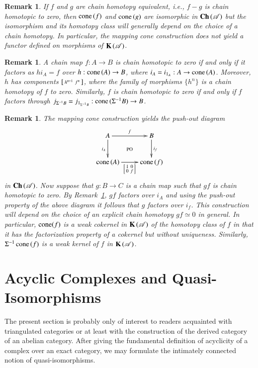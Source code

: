 \documentclass[1p]{elsarticle}
\theoremstyle{mythm}
\theoremstyle{mydef}
\newtheorem{Rem}[Thm]{Remark}
\begin{document}
\begin{Rem}
  If $f$ and $g$ are chain homotopy equivalent, i.e., $f-g$ is chain
  homotopic to zero, then $\operatorname{cone}{(f)}$ and $\operatorname{cone}{(g)}$ are 
  isomorphic in $\operatorname{\mathbf{Ch}}{(\operatorname{\mathscr{A}})}$ but the isomorphism and its homotopy
  class will generally depend on the
  choice of a chain homotopy. In particular, the mapping
  cone construction does not yield a functor defined on morphisms of
  $\operatorname{\mathbf{K}}{(\operatorname{\mathscr{A}})}$. 
\end{Rem}

\begin{Rem}
  \label{rem:cone-factors}
  A chain map $f: A \to B$ is chain homotopic to zero if and only if
  it factors  as $h i_{A} = f$ over $h: \operatorname{cone}{(A)} \to
  B$, where $i_{A} = i_{1_{A}}: A \to
  \operatorname{cone}{(A)}$. Moreover, $h$ has components $\left[\begin{smallmatrix} h^{n+1} & f^{n} \end{smallmatrix}\right]$,
  where the family of morphisms $\{h^{n}\}$ is a chain homotopy of $f$
  to zero. Similarly, $f$ is chain
  homotopic to zero if and only if $f$ factors through $j_{\Sigma^{-1}B} =
  j_{1_{\Sigma^{-1}B}}: \operatorname{cone}{(\Sigma^{-1}B)} \to B$.
\end{Rem}

\begin{Rem}
  \label{rem:cone-weak-cokernel}
  The mapping cone construction yields the push-out diagram
  \[
  \xymatrix{
    A \ar[r]^{f} \ar[d]_{i_A} \ar@{}[dr]|{\text{PO}} &
    B \ar[d]^{i_{f}} \\
    \cone{(A)} \ar[r]_{\mat{1 & 0 \\ 0 & f}} &
    \cone{(f)}
  }
  \]
  in $\operatorname{\mathbf{Ch}}{(\operatorname{\mathscr{A}})}$. Now suppose that $g: B \to C$ is a chain map such
  that $gf$ is chain homotopic to zero. By
  Remark~\ref{rem:cone-factors}, $gf$ factors over $i_{A}$ and using
  the push-out property of the above diagram it follows that $g$
  factors over $i_{f}$. This construction will depend on the choice of
  an explicit chain homotopy $gf \simeq 0$ in general. 
  In particular, $\operatorname{cone}(f)$ is a \emph{weak cokernel} in $\operatorname{\mathbf{K}}{(\operatorname{\mathscr{A}})}$
  of the homotopy class of $f$ in that it has the
  factorization property of a cokernel but without uniqueness.
  Similarly, $\Sigma^{-1}\operatorname{cone}{(f)}$ is a \emph{weak kernel}
  of $f$ in $\operatorname{\mathbf{K}}{(\operatorname{\mathscr{A}})}$.
\end{Rem}

\section{Acyclic Complexes and Quasi-Isomorphisms}
\label{sec:ac-cxes-qis}

The present section is probably only of interest to readers acquainted
with triangulated categories or at least with the construction of
the derived category of an abelian category. After giving the
fundamental definition of acyclicity of a complex over an
exact category, we may formulate the intimately connected 
notion of quasi-isomorphisms.
\end{document}
